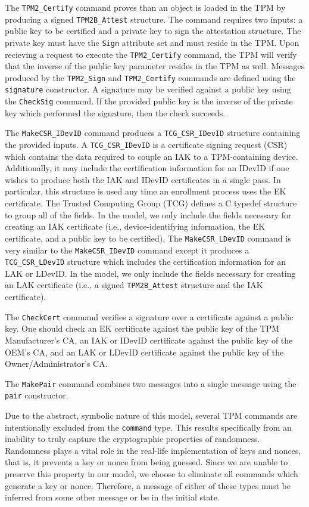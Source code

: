 The \verb|TPM2_Certify| command proves than an object is loaded in the TPM by producing a signed \verb|TPM2B_Attest| structure. The command requires two inputs: a public key to be certified and a private key to sign the attestation structure. The private key must have the \verb|Sign| attribute set and must reside in the TPM. Upon recieving a request to execute the \verb|TPM2_Certify| command, the TPM will verify that the inverse of the public key parameter resides in the TPM as well. Messages produced by the \verb|TPM2_Sign| and \verb|TPM2_Certify| commands are defined using the \verb|signature| constructor. A signature may be verified against a public key using the \verb|CheckSig| command. If the provided public key is the inverse of the private key which performed the signature, then the check succeeds.

The \verb|MakeCSR_IDevID| command produces a \verb|TCG_CSR_IDevID| structure containing the provided inputs. 
 A \verb|TCG_CSR_IDevID| is a certificate signing request (CSR) which contains the data required to couple an IAK to a TPM-containing device. Additionally, it may include the certification information for an IDevID if one wishes to produce both the IAK and IDevID certificates in a single pass. In particular, this structure is used any time an enrollment process uses the EK certificate. The Trusted Computing Group (TCG) defines a C typedef structure to group all of the fields. In the model, we only include the fields necessary for creating an IAK certificate (i.e., device-identifying information, the EK certificate, and a public key to be certified). The \verb|MakeCSR_LDevID| command is very similar to the \verb|MakeCSR_IDevID| command except it produces a \verb|TCG_CSR_LDevID| structure which includes the certification information for an LAK or LDevID. In the model, we only include the fields necessary for creating an LAK certificate (i.e., a signed \verb|TPM2B_Attest| structure and the IAK certificate).

The \verb|CheckCert| command verifies a signature over a certificate against a public key. One should check an EK certificate against the public key of the TPM Manufacturer's CA, an IAK or IDevID certificate against the public key of the OEM's CA, and an LAK or LDevID certificate against the public key of the Owner/Administrator's CA.

The \verb|MakePair| command combines two messages into a single message using the \verb|pair| constructor.




Due to the abstract, symbolic nature of this model, several TPM commands are intentionally excluded from the \verb|command| type. This results specifically from an inability to truly capture the cryptographic properties of randomness. Randomness plays a vital role in the real-life implementation of keys and nonces, that is, it prevents a key or nonce from being guessed. Since we are unable to preserve this property in our model, we choose to eliminate all commands which generate a key or nonce. Therefore, a message of either of these types must be inferred from some other message or be in the initial state. 




